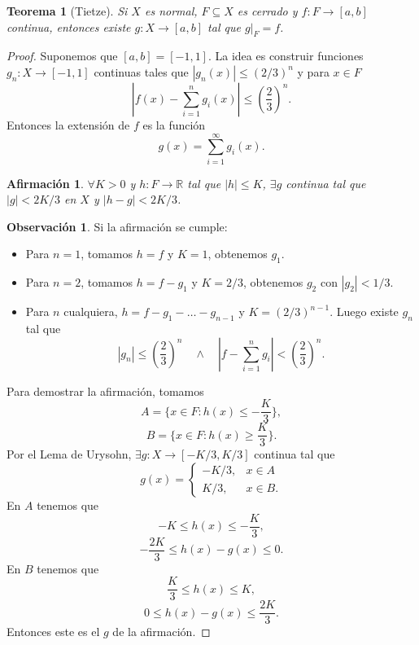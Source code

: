 \documentclass{article}
\newtheorem{theorem}{Teorema}[subsection]
\newtheorem{claim}{Afirmación}
\theoremstyle{definition}
\newtheorem*{obs}{Observación}
\theoremstyle{remark}
\numberwithin{equation}{section}
\newcommand{\R}{\mathbb{R}}
\newcommand{\oo}{\infty}
\newcommand{\abs}[1]{\left| #1 \right|}
\newcommand{\br}[1]{\left( #1 \right)}
\begin{document}
\begin{theorem}
  [Tietze]
  Si $X$ es normal, $F \subseteq X$ es cerrado y $f \colon F \to [a,b]$ continua, entonces existe $g \colon X \to [a,b]$ tal que $g\vert_F = f$.
\end{theorem}
\begin{proof}
  Suponemos que $[a,b] = [-1,1]$. La idea es construir funciones $g_n \colon X \to [-1,1]$ continuas tales que $\abs{g_n(x)} \leq (2/3)^n$ y para $x \in F$
  \[\abs{f(x) - \sum_{i=1}^n g_i(x)} \leq \br{\frac{2}{3}}^n.\]
  Entonces la extensión de $f$ es la función
  \[g(x) = \sum_{i=1}^\oo g_i(x).\]
  \begin{claim}
    $\forall K>0$ y $h \colon F \to \R$ tal que $\abs{h}\leq K$, $\exists g$ continua tal que $\abs g < 2K/3$ en $X$ y $\abs{h-g} < 2K/3$.
  \end{claim}
  \begin{obs}
    Si la afirmación se cumple:
    \begin{itemize}
      \item Para $n=1$, tomamos $h=f$ y $K=1$, obtenemos $g_1$.
      \item Para $n=2$, tomamos $h = f-g_1$ y $K = 2/3$, obtenemos $g_2$ con $\abs{g_2} < 1/3$.
      \item Para $n$ cualquiera, $h = f - g_1 - \dots - g_{n-1}$ y $K = (2/3)^{n-1}$. Luego existe $g_n$ tal que
      \[\abs{g_n} \leq \br{\frac{2}{3}}^n \quad\land\quad \abs{f - \sum_{i=1}^n g_i} < \br{\frac{2}{3}}^n.\]
    \end{itemize}
  \end{obs}
  Para demostrar la afirmación, tomamos
  \[A = \{x \in F \colon h(x) \leq -\frac{K}{3}\},\]
  \[B = \{x \in F \colon h(x) \geq \frac{K}{3}\}.\]
  Por el Lema de Urysohn, $\exists g \colon X \to [-K/3,K/3]$ continua tal que
  \[g(x) = \begin{cases}
    -K/3, &x \in A \\
    K/3, &x \in B.
  \end{cases}\]
  En $A$ tenemos que
  \[-K \leq h(x) \leq -\frac{K}{3},\]
  \[-\frac{2K}{3} \leq h(x) - g(x) \leq 0.\]
  En $B$ tenemos que
  \[\frac K3 \leq h(x) \leq K,\]
  \[0 \leq h(x) - g(x) \leq \frac{2K}{3}.\]
  Entonces este es el $g$ de la afirmación.
\end{proof}
\end{document}
